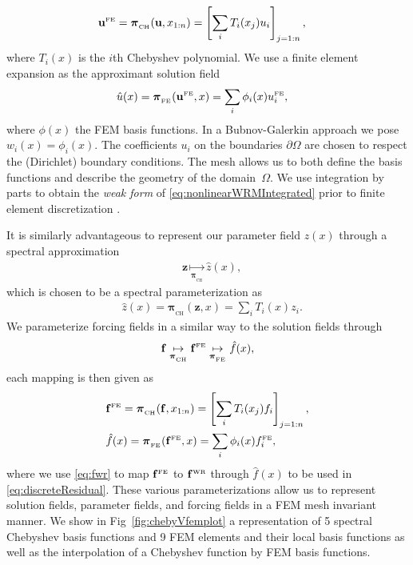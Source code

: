 \documentclass[11pt, fleqn]{article}
\def\z{{\mathbf z}}
\def\fbf{{\mathbf f}}
\def\ubf{{\mathbf u}}
\def\bpi{{\boldsymbol \pi}}
\def\bpi{{\boldsymbol \pi}}
\def \bpiFE{{\bpi_{_\text{FE}}}}
\def \bpiCH{{\bpi_{_\text{CH}}}}
\def \ubfFE {{\ubf^{\text{\tiny FE}}}}
\def \fbfFE {{\fbf^{\text{\tiny FE}}}}
\def \fbfWR {{\fbf^{\text{\tiny WR}}}}
\begin{document}
\begin{align}
\ubfFE &= \bpiCH(\ubf, x_{1:n}) = \left[\sum_i T_i(x_j)u_i\right]_{j=1:n},
\end{align}
where $T_i(x)$ is the $i$th Chebyshev polynomial.
We use a finite element expansion as the approximant solution field
\begin{align}
\hat{u}(x) &= \bpiFE(\ubfFE, x) = \sum_i \phi_i(x){u^{\text{\tiny FE}}_i},
\end{align}
 where $\phi(x)$ the \gls*{FEM} basis functions.
In a Bubnov-Galerkin approach we pose $w_i(x) = \phi_i(x)$. 
The coefficients $u_i$ on the boundaries $\partial \Omega$ are chosen to respect the (Dirichlet) boundary conditions. The mesh allows us to both define the basis functions and describe the geometry of the domain~$\Omega$. We use integration by parts to obtain the \textit{weak form} of \eqref{eq:nonlinearWRMIntegrated}  prior to finite element discretization \cite{brenner2008mathematical}.

It is similarly advantageous to represent our parameter field $z(x)$ through a spectral approximation
\begin{align}
    &\z\underset{\bpiCH}{\mapsto}\hat{z}(x),
\end{align}
which is chosen to be a spectral parameterization as
\begin{align}\label{eq:z_spec_parametrization}
    &\hat{z}(x) = \bpiCH(\z, x) = \sum_i T_i(x)z_i.
\end{align}
%
We parameterize forcing fields in a similar way to the solution fields through
\begin{align}
    \fbf\underset{\bpiCH}{\mapsto}\fbfFE\underset{\bpiFE}{\mapsto}\hat{f}(x),
\end{align}
each mapping is then given as 
\begin{subequations}
\begin{align}
    &\fbfFE = \bpiCH(\fbf, x_{1:n}) = \left[\sum_i T_i(x_j)f_i\right]_{j=1:n}, \\
    &\hat{f}(x) = \bpiFE(\fbf^{\text{\tiny FE}}, x) = \sum_i  \phi_i(x){f}^{\text{\tiny FE}}_i,
\end{align}
\end{subequations}
where we use \eqref{eq:fwr} to map $\fbfFE$ to $\fbfWR$ through $\hat{f}(x)$ to be used in \eqref{eq:discreteResidual}.
These various parameterizations allow us to represent solution fields, parameter fields, and forcing fields in a \gls*{FEM} mesh invariant manner. We show in Fig~\ref{fig:chebyVfemplot} a representation of 5 spectral Chebyshev basis functions and 9 \gls*{FEM} elements and their local basis functions as well as the interpolation of a Chebyshev function by \gls*{FEM} basis functions.
\end{document}
